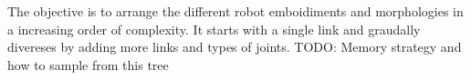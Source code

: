The objective is to arrange the different robot emboidiments and morphologies in a increasing order of complexity. It starts with a single link and graudally divereses by adding more links and types of joints.
TODO: Memory strategy and how to sample from this tree 